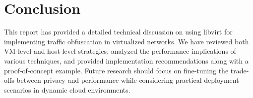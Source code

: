 \documentclass{article}
\begin{document}
\section{Conclusion}
This report has provided a detailed technical discussion on using libvirt for implementing traffic obfuscation in virtualized networks. We have reviewed both VM-level and host-level strategies, analyzed the performance implications of various techniques, and provided implementation recommendations along with a proof-of-concept example. Future research should focus on fine-tuning the trade-offs between privacy and performance while considering practical deployment scenarios in dynamic cloud environments.



\end{document}
